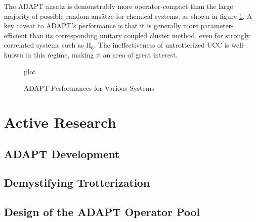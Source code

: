 \documentclass{article}
\begin{document}
\begin{paragraph}{}
The ADAPT ansatz is demonstrably more operator-compact than the large majority of possible random ans{\"a}tze for chemical systems, as shown in figure \ref{adaptplot}. \cite{grimsley} A key caveat to ADAPT's performance is that it is generally more parameter-efficient than its corresponding unitary coupled cluster method, even for strongly correlated systems such as $\mathrm{H_6}$. The ineffectiveness of untrotterized UCC is well-known in this regime, making it an area of great interest. \cite{evangelista}
\begin{figure}[h!]\caption{ADAPT Performances for Various Systems}\label{adaptplot}
plot
\end{figure}


\end{paragraph}


\section{Active Research}
\subsection{ADAPT Development}
\subsection{Demystifying Trotterization}
\subsection{Design of the ADAPT Operator Pool}



\appendix
\end{document}
